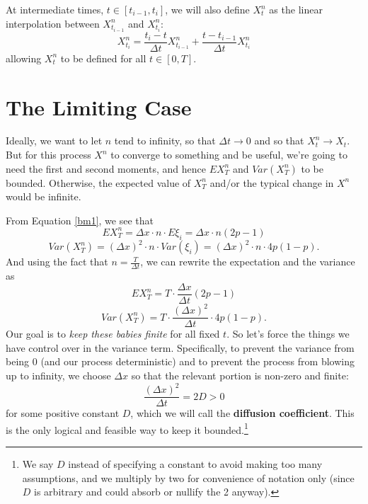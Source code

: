 \documentclass[a4paper,12pt]{scrartcl}
\begin{document}
At intermediate times, $t \in [t_{i-1},t_i]$, we will also define $X^n_t$ as
the linear interpolation between $X^n_{t_{i-1}}$ and  $X^n_{t_{i}}$:
\[ X^n_{t_{i}} = \frac{t_i - t}{\Delta t} X^n_{t_{i-1}} + 
   \frac{t- t_{i -1}} {\Delta t} X^n_{t_{i}} \] 
allowing $X_t^n$ to be defined for all $t \in [0,T]$.

\section{The Limiting Case}

Ideally, we want to let $n$ tend to infinity, so that $\Delta t 
\rightarrow 0$ and so that $X^n_t \rightarrow X_t$.  But for this process
$X^n$ to converge to something and be useful, we're going to need the
first and second moments, and hence $EX^n_T$ and $Var(X^n_T)$ to be 
bounded. Otherwise, the expected value of $X^n_T$ and/or the 
typical change in $X^n$ would be infinite.

From Equation \ref{bm1}, we see that
   \[ EX^n_T  = \Delta x \cdot n \cdot E\xi_i = \Delta x \cdot n(2p-1) \]
   \[Var(X^n_T) = (\Delta x)^2 \cdot n \cdot Var(\xi_i) = 
      (\Delta x)^2 \cdot n \cdot 4p(1-p). \]
And using the fact that $n = \frac{T}{\Delta t}$, we can rewrite the
expectation and the variance as 
\begin{equation} 
   \label{exp}
   EX^n_T = T \cdot \frac{ \Delta x}{\Delta t} (2p-1) 
\end{equation}
\begin{equation}
   \label{var}
   Var(X^n_T) = T \cdot \frac{(\Delta x)^2 }{\Delta t} \cdot 4p(1-p).
\end{equation}
Our goal is to \emph{keep these babies finite} for all fixed $t$. So let's 
force the things we have control over in the variance term.
Specifically, to prevent the variance from being 0 (and our process 
deterministic) and to prevent the process from blowing up to infinity, 
we choose $\Delta x$ so that the relevant portion is non-zero and finite:
\begin{equation}
   \label{diff}
   \frac{(\Delta x)^2}{\Delta t} = 2D > 0
\end{equation}
for some positive constant $D$, which we will call the \textbf{diffusion
coefficient}. This is the only logical and feasible way to keep it
bounded.\footnote{We say $D$ instead of specifying a constant to avoid
making too many assumptions, and we multiply by two for convenience
of notation only (since $D$ is arbitrary and could absorb or nullify
the 2 anyway).}
\end{document}
